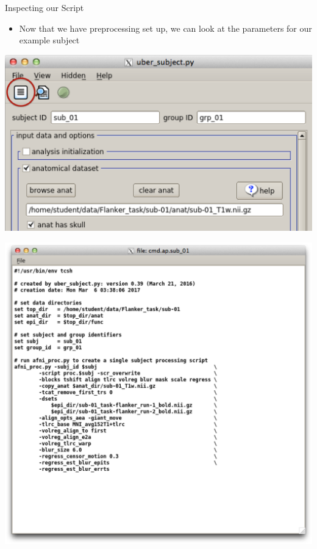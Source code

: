 \documentclass[t,12pt]{beamer}
\begin{document}
\begin{frame}{Inspecting our Script}
\vspace{10pt}
\begin{itemize}
\setlength\itemsep{1em}
\item Now that we have preprocessing set up, we can look at the parameters for our example subject
\end{itemize}
\vspace{4pt}
\begin{minipage}[t]{0.39\textwidth}
\includegraphics[width=\textwidth]{images/gen_afni_proc.png} \\
\end{minipage}
\begin{minipage}{0.59\textwidth}
\includegraphics[width=\textwidth]{images/afni_proc.png} \\
\end{minipage}
\end{frame}
\end{document}
